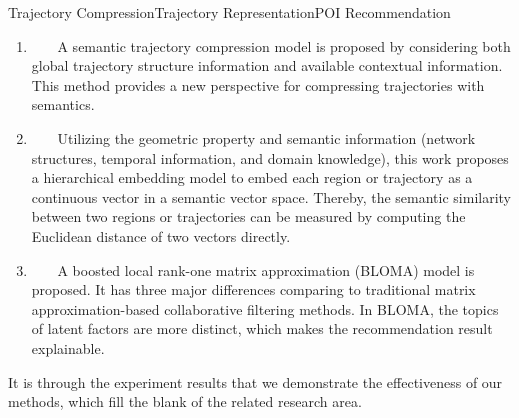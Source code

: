 \begin{Eabstract}{Trajectory Compression}{Trajectory Representation}{POI Recommendation}{}{}
\begin{enumerate}
\item ~~~ A semantic trajectory compression model is proposed by considering both global trajectory structure information and available contextual information. This method provides a new perspective for compressing trajectories with semantics.
\item ~~~ Utilizing the geometric property and semantic information (network structures, temporal information, and domain knowledge), this work proposes a hierarchical embedding model to embed each region or trajectory as a continuous vector in a semantic vector space. Thereby, the semantic similarity between two regions or trajectories can be measured by computing the Euclidean distance of two vectors directly.
\item ~~~ A boosted local rank-one matrix approximation (BLOMA) model is proposed. It has three major differences comparing to traditional matrix approximation-based collaborative filtering methods. In BLOMA, the topics of latent factors are more distinct, which makes the recommendation result explainable.
\end{enumerate}

It is through the experiment results that we demonstrate the effectiveness of our methods, which fill the blank of the related research area.
\end{Eabstract}

